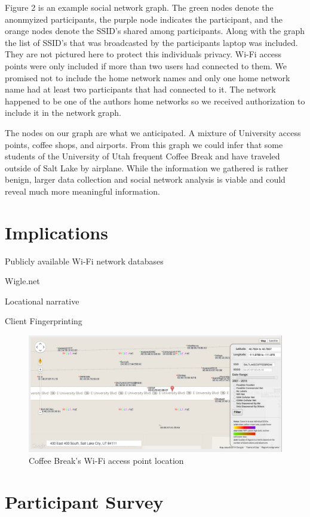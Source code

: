 \documentclass[letterpaper,twocolumn,10pt]{article}
\begin{document}
Figure 2 is an example social network graph. The green nodes denote the anonmyized participants, the purple node indicates the participant, and the orange nodes denote the SSID's shared among participants. Along with the graph the list of SSID's that was broadcasted by the participants laptop was included. They are not pictured here to protect this individuals privacy. Wi-Fi access points were only included if more than two users had connected to them. We promised not to include the home network names and only one home network name had at least two participants that had connected to it. The network happened to be one of the authors home networks so we received authorization to include it in the network graph. 

The nodes on our graph are what we anticipated. A mixture of University access points, coffee shops, and airports. From this graph we could infer that some students of the University of Utah frequent Coffee Break and have traveled outside of Salt Lake by airplane. While the information we gathered is rather benign, larger data collection and social network analysis is viable and could reveal much more meaningful information. 

\section{Implications}
Publicly available Wi-Fi network databases 

Wigle.net

Locational narrative 

Client Fingerprinting

\begin{figure}
\centering
\includegraphics[scale=.43]{wigle}
\caption{\textsf{Coffee Break's Wi-Fi access point location}}
\end{figure}

\section{Participant Survey}
\end{document}
